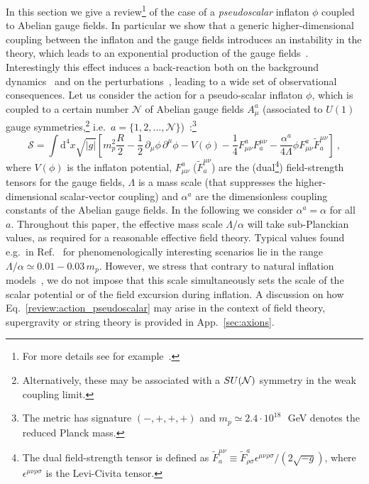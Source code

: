 In this section we give a review\footnote{For more details see for example~\cite{Barnaby:2011vw,Barnaby:2011qe,Linde:2012bt}.} of the case of a \emph{pseudoscalar} inflaton $\phi$ coupled to Abelian gauge fields. In particular we show that a generic higher-dimensional coupling between the inflaton and the gauge fields introduces an instability in the theory, which leads to an exponential production of the gauge fields~\cite{Turner:1987bw, Garretson:1992vt, Anber:2006xt}. Interestingly this effect induces a back-reaction both on the background dynamics~\cite{Anber:2009ua,Barnaby:2011qe,Barnaby:2011vw} and on the perturbations~\cite{Anber:2012du,Linde:2012bt}, leading to a wide set of observational consequences. Let us consider the action for a pseudo-scalar inflaton $\phi$, which is coupled to a certain number $\mathcal{N}$ of Abelian gauge fields $A_\mu^a$ (associated to $U(1)$ gauge symmetries,\footnote{Alternatively, these may be associated with a $SU({\cal N})$ symmetry in the weak coupling limit.} i.e.\ $a = \{1,2,...,\mathcal{N}\}$)~\cite{Turner:1987bw,Garretson:1992vt, Anber:2006xt,Anber:2012du,Anber:2009ua,Barnaby:2011qe,Barnaby:2011vw,Linde:2012bt,Domcke:2016bkh}:\footnote{The metric has signature $(-,+,+,+)$ and $m_p \simeq 2.4 \cdot 10^{18}\,$~GeV denotes the reduced Planck mass.} 
\begin{equation}
\label{review:action_pseudoscalar}
\mathcal{S}= \int \textrm{d}^4 x \sqrt{|g|} \left[m_p^2 \frac{R}{2} -\frac{1}{2} \, \partial_\mu \phi \, \partial^\mu \phi - V(\phi) - \frac{1}{4} F^a_{\mu \nu} F_a^{\mu \nu} - \frac{\alpha^a}{4 \Lambda} \phi F^a_{\mu \nu} \tilde{F}_a^{\mu \nu} \right ]\ ,
\end{equation}
where $V(\phi)$ is the inflaton potential, $F^a_{\mu \nu} $ ($\tilde{F}^{\mu \nu}_{a}$) are the (dual\footnote{The dual field-strength tensor is defined as $\tilde{F}_a^{\mu \nu} \equiv \tilde{F}_{\rho \sigma}^a \epsilon^{\mu \nu \rho \sigma}/(2 \sqrt{-g})$,
where $\epsilon^{\mu \nu \rho \sigma}$ is the Levi-Civita tensor.}) field-strength tensors for the gauge fields, $\Lambda$ is a mass scale (that suppresses the higher-dimensional scalar-vector coupling) and $\alpha^a$ are the dimensionless coupling constants of the Abelian gauge fields. In the following we consider $\alpha^a = \alpha$ for all $a$. Throughout this paper, the effective mass scale $\Lambda/\alpha$ will take sub-Planckian values, 
 as required for a reasonable effective field theory. Typical values found e.g.\ in Ref.~\cite{Domcke:2016bkh} for phenomenologically interesting scenarios lie in the range $\Lambda/\alpha \simeq 0.01 - 0.03 \, m_p$.
However, we stress that contrary to natural inflation models~\cite{Freese:1990rb}, we do not impose that this scale simultaneously sets the scale of the scalar potential or of the field excursion during inflation. A discussion on how Eq.~\eqref{review:action_pseudoscalar} may arise in the context of field theory, supergravity or string theory is provided in App.~\ref{sec:axions}.


